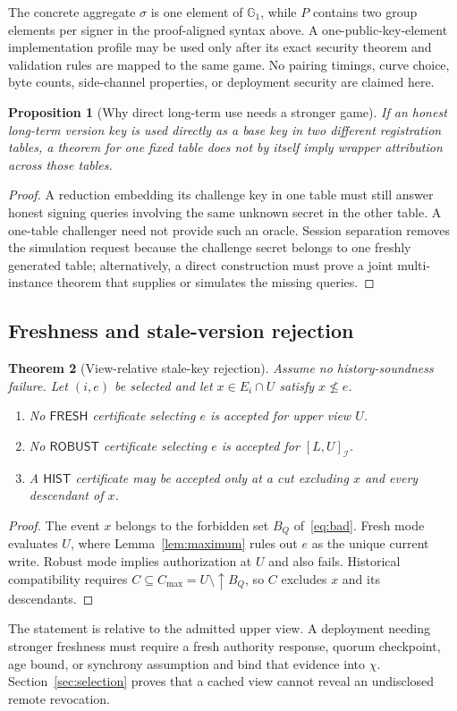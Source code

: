\documentclass[11pt]{article}
\newtheorem{theorem}{Theorem}[section]
\newtheorem{proposition}[theorem]{Proposition}
\theoremstyle{definition}
\newcommand{\Id}{\mathcal I}
\begin{document}
The concrete aggregate $\sigma$ is one element of $\mathbb G_1$, while $P$ contains two group elements per signer in the proof-aligned syntax above.  A one-public-key-element implementation profile may be used only after its exact security theorem and validation rules are mapped to the same game.  No pairing timings, curve choice, byte counts, side-channel properties, or deployment security are claimed here.

\begin{proposition}[Why direct long-term use needs a stronger game]\label{prop:direct-key}
If an honest long-term version key is used directly as a base key in two different registration tables, a theorem for one fixed table does not by itself imply wrapper attribution across those tables.
\end{proposition}
\begin{proof}
A reduction embedding its challenge key in one table must still answer honest signing queries involving the same unknown secret in the other table.  A one-table challenger need not provide such an oracle.  Session separation removes the simulation request because the challenge secret belongs to one freshly generated table; alternatively, a direct construction must prove a joint multi-instance theorem that supplies or simulates the missing queries.
\end{proof}

\subsection{Freshness and stale-version rejection}
\begin{theorem}[View-relative stale-key rejection]\label{thm:stale}
Assume no history-soundness failure.  Let $(i,e)$ be selected and let $x\in E_i\cap U$ satisfy $x\not\leq e$.
\begin{enumerate}
  \item No $\mathsf{FRESH}$ certificate selecting $e$ is accepted for upper view $U$.
  \item No $\mathsf{ROBUST}$ certificate selecting $e$ is accepted for $[L,U]_{\Id}$.
  \item A $\mathsf{HIST}$ certificate may be accepted only at a cut excluding $x$ and every descendant of $x$.
\end{enumerate}
\end{theorem}
\begin{proof}
The event $x$ belongs to the forbidden set $B_Q$ of~\eqref{eq:bad}.  Fresh mode evaluates $U$, where Lemma~\ref{lem:maximum} rules out $e$ as the unique current write.  Robust mode implies authorization at $U$ and also fails.  Historical compatibility requires $C\subseteq C_{\max}=U\setminus\uparrow B_Q$, so $C$ excludes $x$ and its descendants.
\end{proof}
The statement is relative to the admitted upper view.  A deployment needing stronger freshness must require a fresh authority response, quorum checkpoint, age bound, or synchrony assumption and bind that evidence into $\chi$.  Section~\ref{sec:selection} proves that a cached view cannot reveal an undisclosed remote revocation.
\end{document}
